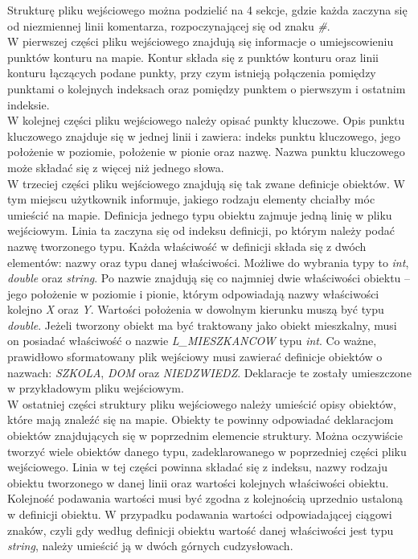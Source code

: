 \documentclass[a4paper,12pt]{article}
\newcommand\tab[1][0.6cm]{\hspace*{#1} }
\begin{document}
Strukturę pliku wejściowego można podzielić na 4 sekcje, gdzie każda zaczyna się od niezmiennej linii komentarza, rozpoczynającej się od znaku \textit{\#}.
\\\tab W pierwszej części pliku wejściowego znajdują się informacje o umiejscowieniu punktów konturu na mapie. Kontur składa się z punktów konturu oraz linii konturu łączących podane punkty, przy czym istnieją połączenia pomiędzy punktami o kolejnych indeksach oraz pomiędzy punktem o pierwszym i ostatnim indeksie.
\\\tab W kolejnej części pliku wejściowego należy opisać punkty kluczowe. Opis punktu kluczowego znajduje się w jednej linii i zawiera: indeks punktu kluczowego, jego położenie w poziomie, położenie w pionie oraz nazwę. Nazwa punktu kluczowego może składać się z więcej niż jednego słowa.
\\\tab W trzeciej części pliku wejściowego znajdują się tak zwane definicje obiektów. W tym miejscu użytkownik informuje, jakiego rodzaju elementy chciałby móc umieścić na mapie. Definicja jednego typu obiektu zajmuje jedną linię w pliku wejściowym. Linia ta zaczyna się od indeksu definicji, po którym należy podać nazwę tworzonego typu. Każda właściwość w definicji składa się z dwóch elementów: nazwy oraz typu danej właściwości. Możliwe do wybrania typy to \textit{int}, \textit{double} oraz \textit{string}. Po nazwie znajdują się co najmniej dwie właściwości obiektu -- jego położenie w poziomie i pionie, którym odpowiadają nazwy właściwości kolejno \textit{X} oraz \textit{Y}. Wartości położenia w dowolnym kierunku muszą być typu \textit{double}. Jeżeli tworzony obiekt ma być traktowany jako obiekt mieszkalny, musi on posiadać właściwość o nazwie \textit{L\_MIESZKANCOW} typu \textit{int}. Co ważne, prawidłowo sformatowany plik wejściowy musi zawierać definicje obiektów o nazwach: \textit{SZKOLA}, \textit{DOM} oraz \textit{NIEDZWIEDZ}. Deklaracje te zostały umieszczone w przykładowym pliku wejściowym.
\\\tab W ostatniej części struktury pliku wejściowego należy umieścić opisy obiektów, które mają znaleźć się na mapie. Obiekty te powinny odpowiadać deklaracjom obiektów znajdujących się w poprzednim elemencie struktury. Można oczywiście tworzyć wiele obiektów danego typu, zadeklarowanego w poprzedniej części pliku wejściowego. Linia w tej części powinna składać się z indeksu, nazwy rodzaju obiektu tworzonego w danej linii oraz wartości kolejnych właściwości obiektu. Kolejność podawania wartości musi być zgodna z kolejnością uprzednio ustaloną w definicji obiektu. W przypadku podawania wartości odpowiadającej ciągowi znaków, czyli gdy według definicji obiektu wartość danej właściwości jest typu \textit{string}, należy umieścić ją w dwóch górnych cudzysłowach.
\end{document}
